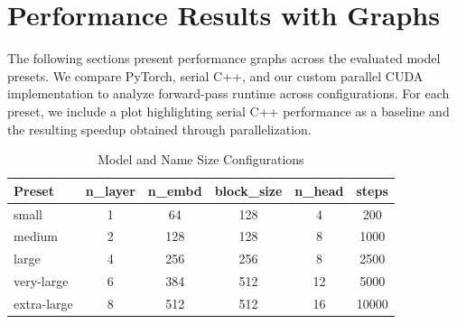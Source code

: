 \section{Performance Results with Graphs}

The following sections present performance graphs across the evaluated model presets. We compare PyTorch, serial C++, and our custom parallel CUDA implementation to analyze forward-pass runtime across configurations. For each preset, we include a plot highlighting serial C++ performance as a baseline and the resulting speedup obtained through parallelization.

\begin{table}[H]
\centering
\begin{tabular}{lccccc}
\hline
\textbf{Preset} & \textbf{n\_layer} & \textbf{n\_embd} & \textbf{block\_size} & \textbf{n\_head} & \textbf{steps} \\
\hline
small        & 1 & 64  & 128 & 4  & 200   \\
medium       & 2 & 128 & 128 & 8  & 1000  \\
large        & 4 & 256 & 256 & 8  & 2500  \\
very-large   & 6 & 384 & 512 & 12 & 5000  \\
extra-large  & 8 & 512 & 512 & 16 & 10000 \\
\hline
\end{tabular}
\caption{Model and Name Size Configurations}
\end{table}

